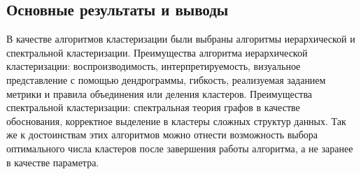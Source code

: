 \subsection{Основные результаты и выводы}
В качестве алгоритмов кластеризации были выбраны алгоритмы иерархической и спектральной кластеризации. Преимущества алгоритма иерархической кластеризации: воспроизводимость, интерпретируемость, визуальное представление с помощью дендрограммы, гибкость, реализуемая заданием метрики и правила объединения или деления кластеров. Преимущества спектральной кластеризации: спектральная теория графов в качестве обоснования, корректное выделение в кластеры сложных структур данных. Так же к достоинствам этих алгоритмов можно отнести возможность выбора оптимального числа кластеров после завершения работы алгоритма, а не заранее в качестве параметра.